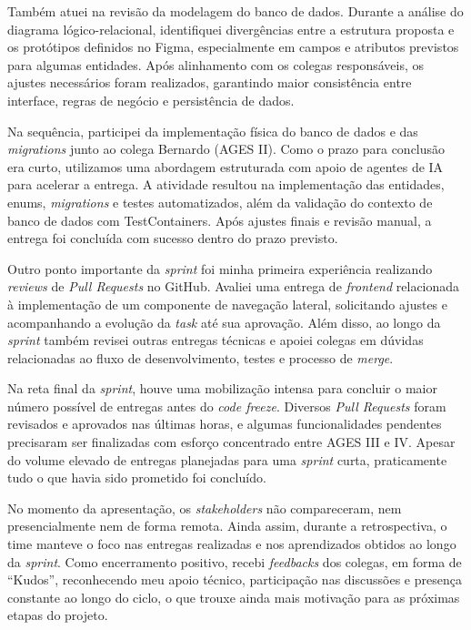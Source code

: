 \indent Também atuei na revisão da modelagem do banco de dados. Durante a análise do diagrama lógico-relacional, identifiquei divergências entre a estrutura proposta e os protótipos definidos no Figma, especialmente em campos e atributos previstos para algumas entidades. Após alinhamento com os colegas responsáveis, os ajustes necessários foram realizados, garantindo maior consistência entre interface, regras de negócio e persistência de dados.\par

\indent Na sequência, participei da implementação física do banco de dados e das \textit{migrations} junto ao colega Bernardo (AGES II). Como o prazo para conclusão era curto, utilizamos uma abordagem estruturada com apoio de agentes de IA para acelerar a entrega. A atividade resultou na implementação das entidades, enums, \textit{migrations} e testes automatizados, além da validação do contexto de banco de dados com TestContainers. Após ajustes finais e revisão manual, a entrega foi concluída com sucesso dentro do prazo previsto.\par

\indent Outro ponto importante da \textit{sprint} foi minha primeira experiência realizando \textit{reviews} de \textit{Pull Requests} no GitHub. Avaliei uma entrega de \textit{frontend} relacionada à implementação de um componente de navegação lateral, solicitando ajustes e acompanhando a evolução da \textit{task} até sua aprovação. Além disso, ao longo da \textit{sprint} também revisei outras entregas técnicas e apoiei colegas em dúvidas relacionadas ao fluxo de desenvolvimento, testes e processo de \textit{merge}.\par

\indent Na reta final da \textit{sprint}, houve uma mobilização intensa para concluir o maior número possível de entregas antes do \textit{code freeze}. Diversos \textit{Pull Requests} foram revisados e aprovados nas últimas horas, e algumas funcionalidades pendentes precisaram ser finalizadas com esforço concentrado entre AGES III e IV. Apesar do volume elevado de entregas planejadas para uma \textit{sprint} curta, praticamente tudo o que havia sido prometido foi concluído.\par

\indent No momento da apresentação, os \textit{stakeholders} não compareceram, nem presencialmente nem de forma remota. Ainda assim, durante a retrospectiva, o time manteve o foco nas entregas realizadas e nos aprendizados obtidos ao longo da \textit{sprint}. Como encerramento positivo, recebi \textit{feedbacks} dos colegas, em forma de “Kudos”, reconhecendo meu apoio técnico, participação nas discussões e presença constante ao longo do ciclo, o que trouxe ainda mais motivação para as próximas etapas do projeto.\par

